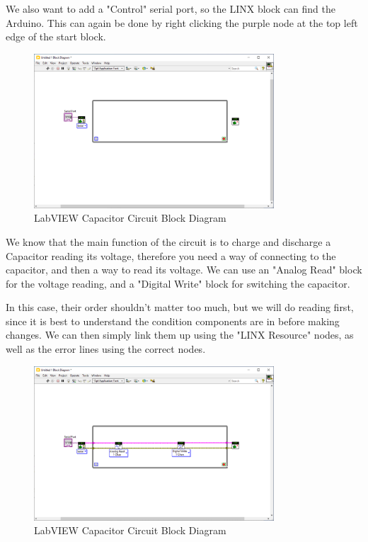 \documentclass[a4paper,11pt]{report}
\begin{document}
We also want to add a "Control" serial port, so the LINX block can find the Arduino. This can again be done by right clicking the purple node at the top left edge of the start block.

\begin{figure}[H]
\centering
\includegraphics[width=0.8\textwidth]{screenshots/labviewcap1}
\caption{LabVIEW Capacitor Circuit Block Diagram}
\end{figure}

We know that the main function of the circuit is to charge and discharge a Capacitor reading its voltage, therefore you need a way of connecting to the capacitor, and then a way to read its voltage. We can use an "Analog Read" block for the voltage reading, and a "Digital Write" block for switching the capacitor.

In this case, their order shouldn't matter too much, but we will do reading first, since it is best to understand the condition components are in before making changes. We can then simply link them up using the "LINX Resource" nodes, as well as the error lines using the correct nodes.

\begin{figure}[H]
\centering
\includegraphics[width=0.8\textwidth]{screenshots/labviewcap2}
\caption{LabVIEW Capacitor Circuit Block Diagram}
\end{figure}
\end{document}

